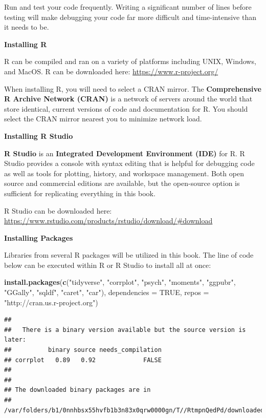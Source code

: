 \documentclass[]{book}
\newenvironment{Shaded}{\begin{snugshade}}{\end{snugshade}}
\newcommand{\DataTypeTok}[1]{\textcolor[rgb]{0.13,0.29,0.53}{#1}}
\newcommand{\KeywordTok}[1]{\textcolor[rgb]{0.13,0.29,0.53}{\textbf{#1}}}
\newcommand{\NormalTok}[1]{#1}
\newcommand{\OtherTok}[1]{\textcolor[rgb]{0.56,0.35,0.01}{#1}}
\newcommand{\StringTok}[1]{\textcolor[rgb]{0.31,0.60,0.02}{#1}}
\begin{document}
Run and test your code frequently. Writing a significant number of lines before testing will make debugging your code far more difficult and time-intensive than it needs to be.

\textbf{Installing R}

R can be compiled and ran on a variety of platforms including UNIX, Windows, and MacOS. R can be downloaded here: \url{https://www.r-project.org/}

When installing R, you will need to select a CRAN mirror. The \textbf{Comprehensive R Archive Network (CRAN)} is a network of servers around the world that store identical, current versions of code and documentation for R. You should select the CRAN mirror nearest you to minimize network load.

\textbf{Installing R Studio}

\textbf{R Studio} is an \textbf{Integrated Development Environment (IDE)} for R. R Studio provides a console with syntax editing that is helpful for debugging code as well as tools for plotting, history, and workspace management. Both open source and commercial editions are available, but the open-source option is sufficient for replicating everything in this book.

R Studio can be downloaded here: \url{https://www.rstudio.com/products/rstudio/download/\#download}

\textbf{Installing Packages}

Libraries from several R packages will be utilized in this book. The line of code below can be executed within R or R Studio to install all at once:

\begin{Shaded}
\begin{Highlighting}[]
\KeywordTok{install.packages}\NormalTok{(}\KeywordTok{c}\NormalTok{(}\StringTok{"tidyverse"}\NormalTok{, }\StringTok{"corrplot"}\NormalTok{, }\StringTok{"psych"}\NormalTok{, }\StringTok{"moments"}\NormalTok{, }\StringTok{"ggpubr"}\NormalTok{, }\StringTok{"GGally"}\NormalTok{, }\StringTok{"sqldf"}\NormalTok{, }\StringTok{"caret"}\NormalTok{, }\StringTok{"car"}\NormalTok{), }\DataTypeTok{dependencies =} \OtherTok{TRUE}\NormalTok{, }\DataTypeTok{repos =} \StringTok{"http://cran.us.r-project.org"}\NormalTok{)}
\end{Highlighting}
\end{Shaded}

\begin{verbatim}
## 
##   There is a binary version available but the source version is later:
##          binary source needs_compilation
## corrplot   0.89   0.92             FALSE
## 
## 
## The downloaded binary packages are in
##  /var/folders/b1/0nnhbsx55hvfb1b3n83x0qrw0000gn/T//RtmpnQedPd/downloaded_packages
\end{verbatim}
\end{document}
